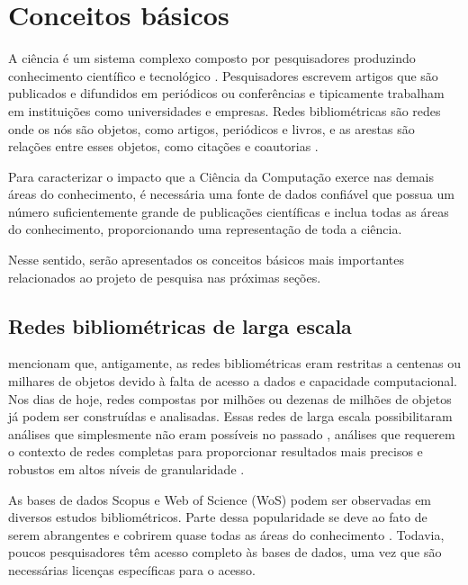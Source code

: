 \chapter[Conceitos básicos]{Conceitos básicos}

A ciência é um sistema complexo composto por pesquisadores produzindo conhecimento científico e tecnológico \cite{boyack2019creation}. Pesquisadores escrevem artigos que são publicados e difundidos em periódicos ou conferências e tipicamente trabalham em instituições como universidades e empresas. Redes bibliométricas são redes onde os nós são objetos, como artigos, periódicos e livros, e as arestas são relações entre esses objetos, como citações e coautorias \cite{glanzel2003bibliometrics}.

Para caracterizar o impacto que a Ciência da Computação exerce nas demais áreas do conhecimento, é necessária uma fonte de dados confiável que possua um número suficientemente grande de publicações científicas e inclua todas as áreas do conhecimento, proporcionando uma representação de toda a ciência.

Nesse sentido, serão apresentados os conceitos básicos mais importantes relacionados ao projeto de pesquisa nas próximas seções.

\section{Redes bibliométricas de larga escala}

 mencionam que, antigamente, as redes bibliométricas eram restritas a centenas ou milhares de objetos devido à falta de acesso a dados e capacidade computacional. Nos dias de hoje, redes compostas por milhões ou dezenas de milhões de objetos já podem ser construídas e analisadas. Essas redes de larga escala possibilitaram análises que simplesmente não eram possíveis no passado , análises que requerem o contexto de redes completas para proporcionar resultados mais precisos e robustos em altos níveis de granularidade \cite{boyack2019creation}.

As bases de dados Scopus e Web of Science (WoS) podem ser observadas em diversos estudos bibliométricos. Parte dessa popularidade se deve ao fato de serem abrangentes e cobrirem quase todas as áreas do conhecimento \cite{boyack2019creation}. Todavia, poucos pesquisadores têm acesso completo às bases de dados, uma vez que são necessárias licenças específicas para o acesso.

